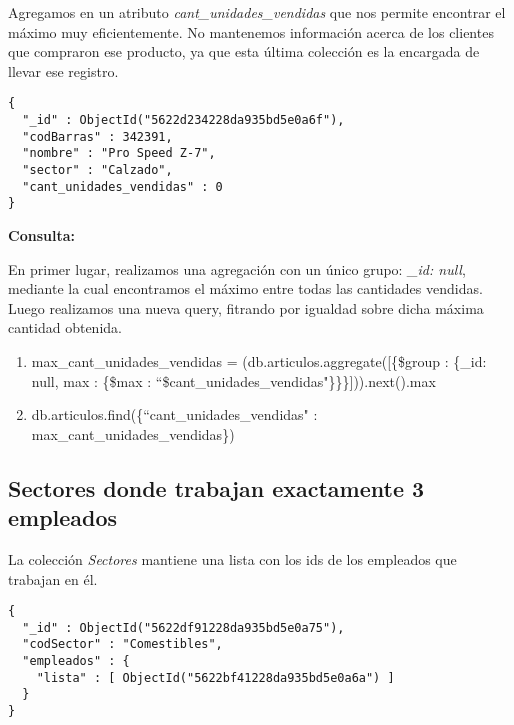 Agregamos en un atributo \emph{cant\_unidades\_vendidas} que nos permite encontrar el máximo
muy eficientemente.
No mantenemos información acerca de los clientes que compraron ese producto, ya que esta
última colección es la encargada de llevar ese registro.

\begin{listing}
\begin{verbatim}
{
  "_id" : ObjectId("5622d234228da935bd5e0a6f"),
  "codBarras" : 342391,
  "nombre" : "Pro Speed Z-7",
  "sector" : "Calzado",
  "cant_unidades_vendidas" : 0
}
\end{verbatim}
\caption{Ejemplo Artículo}
\label{json-example}
\end{listing}

\textbf{Consulta: }

En primer lugar, realizamos una agregación con un único grupo: \emph{\_id: null}, mediante la cual
encontramos el máximo entre todas las cantidades vendidas.
Luego realizamos una nueva query, fitrando por igualdad sobre dicha máxima cantidad obtenida.

\begin{enumerate}
  \item max_cant_unidades_vendidas = (db.articulos.aggregate([\{\$group : \{_id: null, max : \{\$max : ``\$cant_unidades_vendidas"\}\}\}])).next().max
  \item db.articulos.find(\{``cant_unidades_vendidas" : max_cant_unidades_vendidas\})
\end{enumerate}

\subsection{Sectores donde trabajan exactamente 3 empleados}

La colección \emph{Sectores} mantiene una lista con los ids de los empleados que trabajan en él.

\begin{listing}
\begin{verbatim}
{
  "_id" : ObjectId("5622df91228da935bd5e0a75"),
  "codSector" : "Comestibles",
  "empleados" : {
    "lista" : [ ObjectId("5622bf41228da935bd5e0a6a") ]
  }
}
\end{verbatim}
\caption{Ejemplo Sector}
\label{json-example}
\end{listing}



